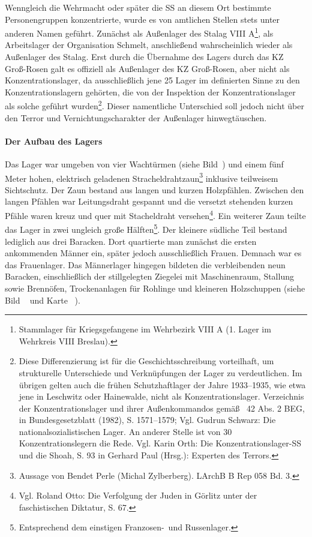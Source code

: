 Wenngleich die Wehrmacht oder später die SS an diesem Ort bestimmte Personengruppen \glqq konzentrierte\grqq, wurde es von amtlichen Stellen stets unter anderen Namen geführt. Zunächst als Außenlager des Stalag VIII A\footnote{Stammlager für Kriegsgefangene im Wehrbezirk VIII A (1. Lager im Wehrkreis VIII Breslau).}, als Arbeitslager der Organisation Schmelt, anschließend wahrscheinlich wieder als Außenlager des Stalag.
Erst durch die Übernahme des Lagers durch das KZ Groß-Rosen galt es offiziell als Außenlager des KZ Groß-Rosen, aber nicht als Konzentrationslager, da ausschließlich jene 25 Lager im definierten Sinne zu den Konzentrationslagern gehörten, die von der Inspektion der Konzentrationslager als solche geführt wurden\footnote{Diese Differenzierung ist für die Geschichtsschreibung vorteilhaft, um strukturelle Unterschiede und Verknüpfungen der Lager zu verdeutlichen. Im übrigen gelten auch die frühen Schutzhaftlager der Jahre 1933--1935, wie etwa jene in Leschwitz oder Hainewalde, nicht als Konzentrationslager. Verzeichnis der Konzentrationslager und ihrer Außenkommandos gemäß \textsection~42 Abs. 2 BEG, in Bundesgesetzblatt (1982), S. 1571--1579; Vgl. Gudrun Schwarz: Die nationalsozialistischen Lager.
An anderer Stelle ist von 30 Konzentrationslegern die Rede. Vgl. Karin Orth: Die Konzentrationslager-SS und die Shoah, S. 93 in Gerhard Paul (Hrsg.): Experten des Terrors.}. Dieser namentliche Unterschied soll jedoch nicht über den Terror und Vernichtungscharakter der Außenlager hinwegtäuschen.

\paragraph{Der Aufbau des Lagers} Das Lager war umgeben von vier Wachtürmen (siehe Bild~) und einem fünf Meter hohen, elektrisch geladenen Stracheldrahtzaun\footnote{Aussage von Bendet Perle (Michal Zylberberg). LArchB B Rep 058 Bd. 3.} inklusive teilweisem Sichtschutz. Der Zaun bestand aus langen und kurzen Holzpfählen. Zwischen den langen Pfählen war Leitungsdraht gespannt und die versetzt stehenden kurzen Pfähle waren kreuz und quer mit Stacheldraht versehen\footnote{Vgl. Roland Otto: Die Verfolgung der Juden in Görlitz unter der faschistischen Diktatur, S. 67.}. Ein weiterer Zaun teilte das Lager in zwei ungleich große Hälften\footnote{Entsprechend dem einstigen \glqq Franzosen-\grqq~und \glqq Russenlager\grqq.}. Der kleinere südliche Teil bestand lediglich aus drei Baracken. Dort quartierte man zunächst die ersten ankommenden Männer ein, später jedoch ausschließlich Frauen. Demnach war es das Frauenlager. Das Männerlager hingegen bildeten die verbleibenden neun Baracken, einschließlich der stillgelegten Ziegelei mit Maschinenraum, Stallung sowie Brennöfen, Trockenanlagen für Rohlinge und kleineren Holzschuppen (siehe Bild ~ und Karte ~).\newline

